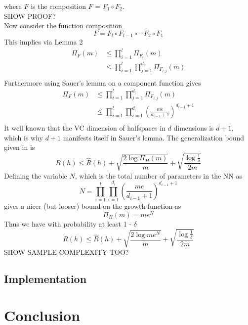 \documentclass{article} %
\begin{document}
where $F$ is the composition $F$ = $F_1 \circ F_2$.
\\
SHOW PROOF?
\\
Now consider the function composition
$$
F = F_l \circ F_{l-1} \circ \cdots F_2 \circ F_1
$$
This implies via Lemma 2
\begin{align*}
\Pi_F(m) &\leq \prod_{i=1}^l \Pi_{F_i}(m)\\
& \leq \prod_{i=1}^l\prod_{j=1}^{d_i} \Pi_{F_{i,j}}(m)\\
\end{align*}
Furthermore using Sauer's lemma on a component function gives
\begin{align*}
\Pi_F(m)& \leq \prod_{i=1}^l\prod_{j=1}^{d_i} \Pi_{F_{i,j}}(m)\\
& \leq \prod_{i=1}^l\prod_{i=1}^{d_i}(\frac{me}{d_{i-1}+1})^{d_{i-1}+1}\\
\end{align*}
It well known that the VC dimension of halfspaces in $d$ dimensions is $d +1$, which is why $d+1$ manifests itself in Sauer's lemma.
The generalization bound given in \cite{mohri_foundations_2012} is 
$$
R(h) \leq \widehat{R}(h) + \sqrt{\frac{2\log{\Pi_H{(m)}}}{m}} + \sqrt{\frac{\log{\frac{1}{\delta}}}{2m}}
$$
Defining the variable $N$, which is the total number of parameters in the NN as 
$$
N = \prod_{i=1}^l\prod_{i=1}^{d_i}(\frac{me}{d_{i-1}+1})^{d_{i-1}+1}
$$ 
gives a nicer (but looser) bound on the growth function as
$$
\Pi_H{(m)} = me^N
$$
Thus we have with probability at least 1 - $\delta$
$$
R(h) \leq \widehat{R}(h) + \sqrt{\frac{2\log{me^N}}{m}} + \sqrt{\frac{\log{\frac{1}{\delta}}}{2m}}
$$
SHOW SAMPLE COMPLEXITY TOO?
\subsection{Implementation}
\section{Conclusion}



\nocite{yang_multiagent_2004}
\nocite{kim_autonomous_2003}
\nocite{mohri_foundations_2012}

\newpage
{}





\end{document}
